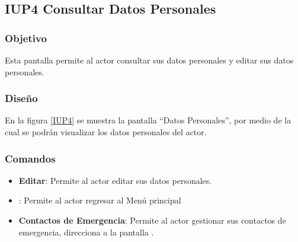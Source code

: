 \subsection{IUP4 Consultar Datos Personales}
 
\subsubsection{Objetivo}

    Esta pantalla permite al actor consultar sus datos personales y editar sus datos personales.

\subsubsection{Diseño}

    En la figura \ref{IUP4} se muestra la pantalla ``Datos Personales'', por medio de la cual se podrán visualizar los datos personales del actor. \\


\subsubsection{Comandos}
\begin{itemize}
    \item \textbf{Editar}: Permite al actor editar sus datos personales.
    \item {}: Permite al actor regresar al Menú principal
    \item \textbf{Contactos de Emergencia}: Permite al actor gestionar sus contactos de emergencia, direcciona a la pantalla .
\end{itemize}

%
